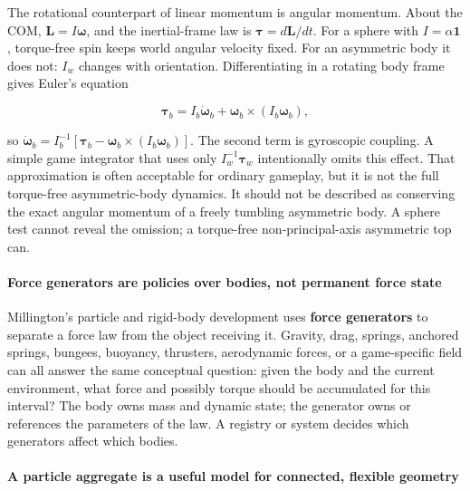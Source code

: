 The rotational counterpart of linear momentum is angular momentum. About the COM, \(\mathbf L=I\boldsymbol\omega\), and the inertial-frame law is \(\boldsymbol\tau=d\mathbf L/dt\). For a sphere with \(I=\alpha\mathbf1\), torque-free spin keeps world angular velocity fixed. For an asymmetric body it does not: \(I_w\) changes with orientation. Differentiating in a rotating body frame gives Euler's equation

\[
\boldsymbol\tau_b=I_b\dot{\boldsymbol\omega}_b+\boldsymbol\omega_b\times(I_b\boldsymbol\omega_b),
\]

so \(\dot{\boldsymbol\omega}_b=I_b^{-1}[\boldsymbol\tau_b-\boldsymbol\omega_b\times(I_b\boldsymbol\omega_b)]\). The second term is gyroscopic coupling. A simple game integrator that uses only \(I_w^{-1}\boldsymbol\tau_w\) intentionally omits this effect. That approximation is often acceptable for ordinary gameplay, but it is not the full torque-free asymmetric-body dynamics. It should not be described as conserving the exact angular momentum of a freely tumbling asymmetric body. A sphere test cannot reveal the omission; a torque-free non-principal-axis asymmetric top can.

\paragraph{Force generators are policies over bodies, not permanent force state}\label{force-generators-are-policies-over-bodies-not-permanent-force-state}

Millington's particle and rigid-body development uses \textbf{force generators} to separate a force law from the object receiving it. Gravity, drag, springs, anchored springs, bungees, buoyancy, thrusters, aerodynamic forces, or a game-specific field can all answer the same conceptual question: given the body and the current environment, what force and possibly torque should be accumulated for this interval? The body owns mass and dynamic state; the generator owns or references the parameters of the law. A registry or system decides which generators affect which bodies.

\paragraph{A particle aggregate is a useful model for connected, flexible geometry}\label{a-particle-aggregate-is-a-useful-model-for-connected-flexible-geometry}

